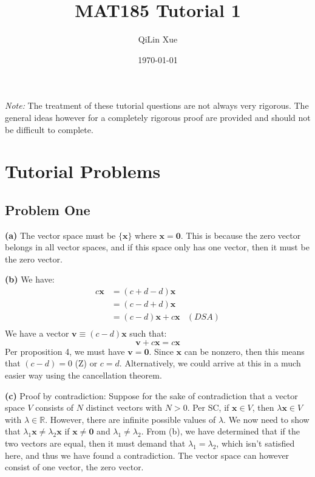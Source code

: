 \documentclass{article}
\title{MAT185 Tutorial 1}
\author{QiLin Xue}
\date{\today}
\begin{document}
\maketitle
\textit{Note:} The treatment of these tutorial questions are not always very rigorous. The general ideas however for a completely rigorous proof are provided and should not be difficult to complete.
\section{Tutorial Problems}
\subsection*{Problem One}
\textbf{(a)} The vector space must be $\{\bm{x}\}$ where $\bm{x}=\bm{0}$. This is because the zero vector belongs in all vector spaces, and if this space only has one vector, then it must be the zero vector.
\vspace{2mm}

\noindent \textbf{(b)} We have:
\begin{align}
    c\bm{x} &= (c+d-d)\bm{x} \\ 
    &= (c-d+d)\bm{x} \\ 
    &= (c-d)\bm{x} + c\bm{x} & (DSA) \\
\end{align}
We have a vector $\bm{v} \equiv (c-d) \bm{x}$ such that:
\begin{equation}
    \bm{v} + c\bm{x} = c\bm{x} 
\end{equation}
Per proposition 4, we must have $\bm{v} = \bm{0}$. Since $\bm{x}$ can be nonzero, then this means that $(c-d)=0$ (Z) or $c=d$. Alternatively, we could arrive at this in a much easier way using the cancellation theorem.
\vspace{2mm}

\noindent \textbf{(c)} Proof by contradiction: Suppose for the sake of contradiction that a vector space $V$ consists of $N$ distinct vectors with $N>0$. Per SC, if $\bm{x} \in V$, then $\lambda \bm{x} \in V$ with $\lambda \in \mathbb{R}$. However, there are infinite possible values of $\lambda$. We now need to show that $\lambda_1 \bm{x} \neq \lambda_2 \bm{x}$ if $\bm{x}\neq \bm{0}$ and $\lambda_1 \neq \lambda_2$. From (b), we have determined that if the two vectors are equal, then it must demand that $\lambda_1 = \lambda_2$, which isn't satisfied here, and thus we have found a contradiction. The vector space can however consist of one vector, the zero vector.
\end{document}

